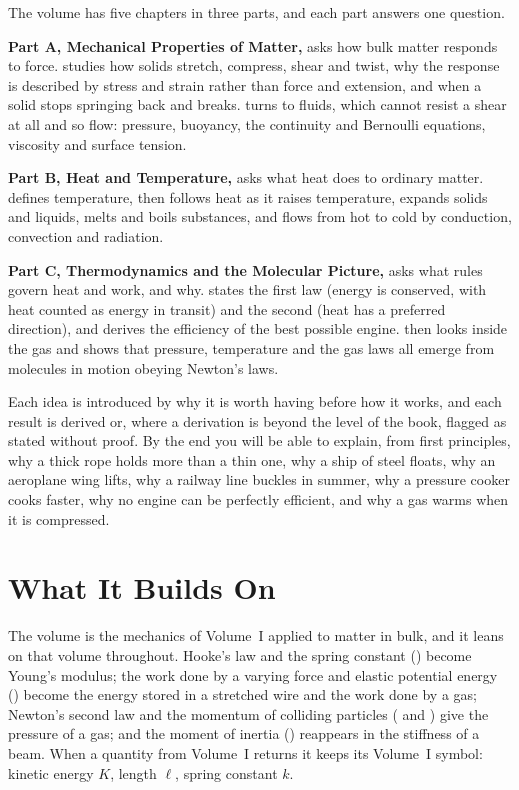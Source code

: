 The volume has five chapters in three parts, and each part answers one question.

\textbf{Part A, Mechanical Properties of Matter,} asks how bulk matter responds to force.
 studies how solids stretch, compress, shear and twist, why the response is described by
stress and strain rather than force and extension, and when a solid stops springing back and breaks.
 turns to fluids, which cannot resist a shear at all and so flow: pressure, buoyancy,
the continuity and Bernoulli equations, viscosity and surface tension.

\textbf{Part B, Heat and Temperature,} asks what heat does to ordinary matter.  defines
temperature, then follows heat as it raises temperature, expands solids and liquids, melts and boils
substances, and flows from hot to cold by conduction, convection and radiation.

\textbf{Part C, Thermodynamics and the Molecular Picture,} asks what rules govern heat and work, and why.
 states the first law (energy is conserved, with heat counted as energy in transit) and
the second (heat has a preferred direction), and derives the efficiency of the best possible engine.
 then looks inside the gas and shows that pressure, temperature and the gas laws all
emerge from molecules in motion obeying Newton's laws.

Each idea is introduced by why it is worth having before how it works, and each result is derived or, where
a derivation is beyond the level of the book, flagged as stated without proof. By the end you will be able
to explain, from first principles, why a thick rope holds more than a thin one, why a ship of steel floats,
why an aeroplane wing lifts, why a railway line buckles in summer, why a pressure cooker cooks faster, why
no engine can be perfectly efficient, and why a gas warms when it is compressed.

\section*{What It Builds On}

The volume is the mechanics of Volume~I applied to matter in bulk, and it leans on that volume
throughout. Hooke's law and the spring constant () become Young's modulus;
the work done by a varying force and elastic potential energy () become the energy
stored in a stretched wire and the work done by a gas; Newton's second law and the momentum of colliding
particles ( and ) give the pressure of a gas; and the moment of
inertia () reappears in the stiffness of a beam. When a quantity from Volume~I returns it
keeps its Volume~I symbol: kinetic energy $K$, length $\ell$, spring constant $k$.

